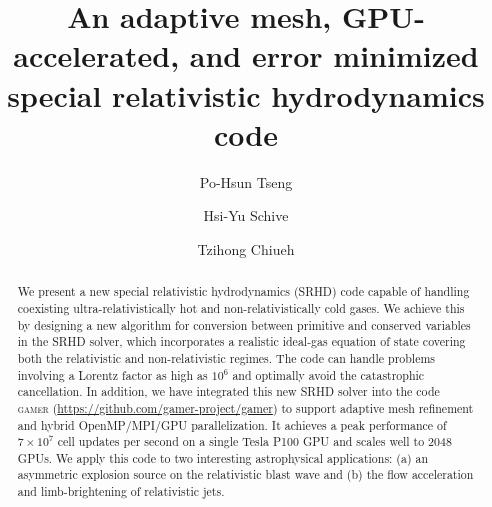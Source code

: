 \documentclass[twocolumn]{aastex63}
\begin{document}
\title{An adaptive mesh, GPU-accelerated, and error minimized special relativistic hydrodynamics code}


\author[0000-0002-1868-0660]{Po-Hsun Tseng}

\author[0000-0002-1249-279X]{Hsi-Yu Schive}

\author[0000-0003-2654-8763]{Tzihong Chiueh}





\begin{abstract}
We present a new special relativistic hydrodynamics (SRHD) code capable of handling coexisting ultra-relativistically hot and non-relativistically cold gases. We achieve this by designing a new algorithm for conversion between primitive and conserved variables in the SRHD solver, which incorporates a realistic ideal-gas equation of state covering both the relativistic and non-relativistic regimes. The code can handle problems involving a Lorentz factor as high as $10^6$ and optimally avoid the catastrophic cancellation. In addition, we have integrated this new SRHD solver into the code \textsc{gamer} (\url{https://github.com/gamer-project/gamer}) to support adaptive mesh refinement and hybrid OpenMP/MPI/GPU parallelization. It achieves a peak performance of $7\times 10^{7}$ cell updates per second on a single Tesla P100 GPU and scales well to 2048 GPUs. We apply this code to two interesting astrophysical applications: (a) an asymmetric explosion source on the relativistic blast wave and (b) the flow acceleration and limb-brightening of relativistic jets.
\end{abstract}
\end{document}
